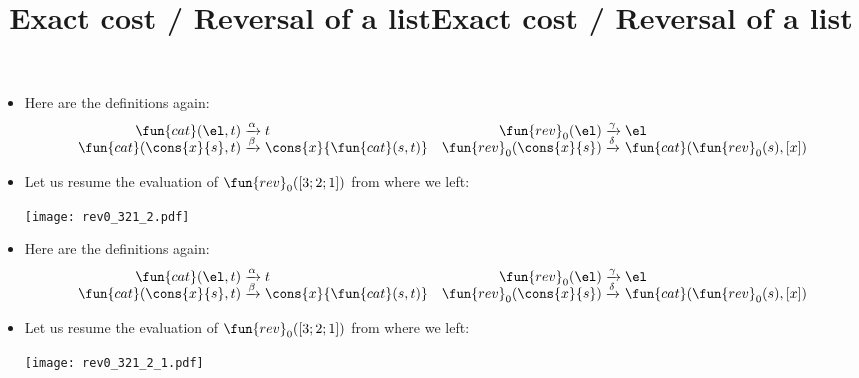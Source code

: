 \documentclass[wide]{slides}
\begin{document}
\begin{slide}
  \title{Exact cost / Reversal of a list}

  \begin{itemize}

    \item Here are the definitions again:
      \begin{equation*}
        \begin{array}{@{}r@{\;}l@{\;}lr@{\;}l@{\;}l@{}}
          \fun{cat}(\el,t)
          & \xrightarrow{\alpha} & t
          & \fun{rev}_0(\el)
          & \xrightarrow{\smash{\gamma}} & \el\\
          \fun{cat}(\cons{x}{s},t)
          & \xrightarrow{\smash{\beta}} & \cons{x}{\fun{cat}(s,t)}
          & \fun{rev}_0(\cons{x}{s})
          & \xrightarrow{\smash{\delta}} & \fun{cat}(\fun{rev}_0(s),[x])
        \end{array}
      \end{equation*}

      \item Let us resume the evaluation of \(\fun{rev}_0([3;2;1])\)
        from where we left:
        \begin{center}
          \texttt{[image: rev0\_321\_2.pdf]}
        \end{center}

  \end{itemize}

\end{slide}

\begin{slide}
  \title{Exact cost / Reversal of a list}

  \begin{itemize}

    \item Here are the definitions again:
      \begin{equation*}
        \begin{array}{@{}r@{\;}l@{\;}lr@{\;}l@{\;}l@{}}
          \fun{cat}(\el,t)
          & \xrightarrow{\alpha} & t
          & \fun{rev}_0(\el)
          & \xrightarrow{\smash{\gamma}} & \el\\
          \fun{cat}(\cons{x}{s},t)
          & \xrightarrow{\smash{\beta}} & \cons{x}{\fun{cat}(s,t)}
          & \fun{rev}_0(\cons{x}{s})
          & \xrightarrow{\smash{\delta}} & \fun{cat}(\fun{rev}_0(s),[x])
        \end{array}
      \end{equation*}

      \item Let us resume the evaluation of \(\fun{rev}_0([3;2;1])\)
        from where we left:
        \begin{center}
          \texttt{[image: rev0\_321\_2\_1.pdf]}
        \end{center}

  \end{itemize}

\end{slide}
\end{document}
